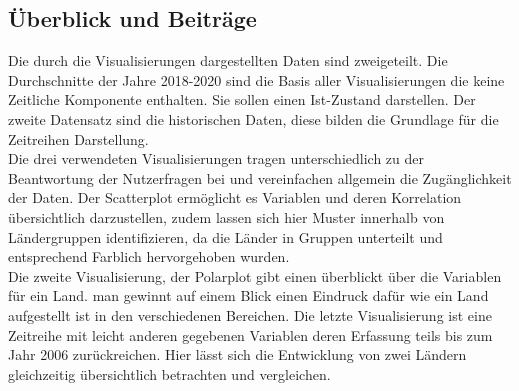 \subsection{Überblick und Beiträge}
Die durch die Visualisierungen dargestellten Daten sind zweigeteilt. Die Durchschnitte der Jahre 2018-2020 sind die Basis aller Visualisierungen die keine Zeitliche Komponente enthalten. Sie sollen einen Ist-Zustand darstellen. Der zweite Datensatz sind die historischen Daten, diese bilden die Grundlage für die Zeitreihen Darstellung. \\

Die drei verwendeten Visualisierungen tragen unterschiedlich zu der Beantwortung der Nutzerfragen bei und vereinfachen allgemein die Zugänglichkeit der Daten. Der Scatterplot ermöglicht es Variablen und deren Korrelation übersichtlich darzustellen, zudem lassen sich hier Muster innerhalb von Ländergruppen identifizieren, da die Länder in Gruppen unterteilt und entsprechend Farblich hervorgehoben wurden. \\

Die zweite Visualisierung, der Polarplot gibt einen überblickt über die Variablen für ein Land. man gewinnt auf einem Blick einen Eindruck dafür wie ein Land aufgestellt ist in den verschiedenen Bereichen. Die letzte Visualisierung ist eine Zeitreihe mit leicht anderen gegebenen Variablen deren Erfassung teils bis zum Jahr 2006 zurückreichen. Hier lässt sich die Entwicklung von zwei Ländern gleichzeitig übersichtlich betrachten und vergleichen.